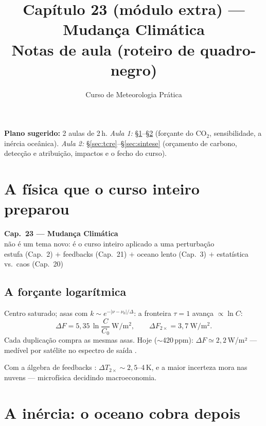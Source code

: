 \documentclass[11pt]{article}
\title{Capítulo 23 (módulo extra) --- Mudança Climática\\
{\large Notas de aula (roteiro de quadro-negro)}}
\author{Curso de Meteorologia Prática}
\date{}
\begin{document}
\maketitle
\thispagestyle{fancy}

\noindent\textbf{Plano sugerido:} 2 aulas de 2\,h.
\emph{Aula 1:} \S\ref{sec:forcante}--\S\ref{sec:inercia} (forçante do
CO$_2$, sensibilidade, a inércia oceânica).
\emph{Aula 2:} \S\ref{sec:tcre}--\S\ref{sec:sintese} (orçamento de
carbono, detecção e atribuição, impactos e o fecho do curso).

\section{A física que o curso inteiro preparou}\label{sec:forcante}

\begin{noquadro}[abertura]
\textbf{Cap.~23 --- Mudança Climática}\\[2pt]
não é um tema novo: é o curso inteiro aplicado a uma perturbação\\
estufa (Cap.~2) $+$ feedbacks (Cap.~21) $+$ oceano lento (Cap.~3)
$+$ estatística vs.\ caos (Cap.~20)
\end{noquadro}

\subsection{A forçante logarítmica}


\begin{formadif}
Centro saturado; asas com $k \sim e^{-|\nu-\nu_0|/\Delta}$: a
fronteira $\tau = 1$ avança $\propto \ln C$:
\[ \Delta F = 5{,}35\,\ln\frac{C}{C_0}\ \mathrm{W/m^2},\qquad
\Delta F_{2\times} = 3{,}7\ \mathrm{W/m^2}. \]
Cada duplicação compra as mesmas asas. Hoje ($\sim$420\,ppm):
$\Delta F \simeq 2{,}2$\,W/m² — medível por satélite no espectro de
saída .
\end{formadif}

Com a álgebra de feedbacks :
$\Delta T_{2\times} \sim 2{,}5$--4\,K, e a maior incerteza mora nas
nuvens  — microfísica decidindo macroeconomia.

\section{A inércia: o oceano cobra depois}\label{sec:inercia}
\end{document}
